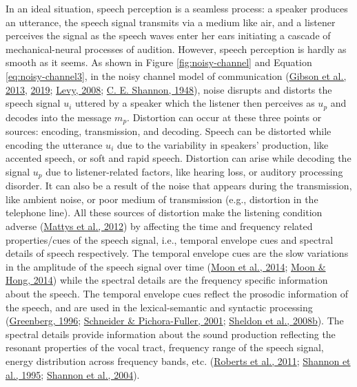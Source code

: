 \documentclass[a4paper, nobind]{templates/ociamthesis}
\begin{document}
In an ideal situation, speech perception is a seamless process: a speaker produces an utterance, the speech signal transmits via a medium like air, and a listener perceives the signal as the speech waves enter her ears initiating a cascade of mechanical-neural processes of audition.
However, speech perception is hardly as smooth as it seems.
As shown in Figure \ref{fig:noisy-channel} and Equation \eqref{eq:noisy-channel3}, in the noisy channel model of communication (\protect\hyperlink{ref-Gibson2013}{Gibson et al., 2013}, \protect\hyperlink{ref-Gibson2019}{2019}; \protect\hyperlink{ref-Levy2008}{Levy, 2008}; \protect\hyperlink{ref-Shannon1948}{C. E. Shannon, 1948}),
noise disrupts and distorts the speech signal \(u_i\) uttered by a speaker
which the listener then perceives as \(u_p\) and decodes into the message \(m_p\).
Distortion can occur at these three points or sources: encoding, transmission, and decoding.
Speech can be distorted while encoding the utterance \(u_i\) due to the variability in speakers' production, like accented speech, or soft and rapid speech.
Distortion can arise while decoding the signal \(u_p\) due to listener-related factors, like hearing loss, or auditory processing disorder.
It can also be a result of the noise that appears during the transmission, like ambient noise, or poor medium of transmission (e.g., distortion in the telephone line).
All these sources of distortion make the listening condition adverse (\protect\hyperlink{ref-Mattys2012}{Mattys et al., 2012}) by affecting the time and frequency related properties/cues of the speech signal, i.e., temporal envelope cues and spectral details of speech respectively.
The temporal envelope cues are the slow variations in the amplitude of the speech signal over time (\protect\hyperlink{ref-Moon2014}{Moon et al., 2014}; \protect\hyperlink{ref-Moon2014a}{Moon \& Hong, 2014}) while the spectral details are the frequency specific information about the speech.
The temporal envelope cues reflect the prosodic information of the speech, and are used in the lexical-semantic and syntactic processing (\protect\hyperlink{ref-Greenberg1996}{Greenberg, 1996}; \protect\hyperlink{ref-Schneider2001}{Schneider \& Pichora-Fuller, 2001}; \protect\hyperlink{ref-Sheldon2008b}{Sheldon et al., 2008b}).
The spectral details provide information about the sound production reflecting the resonant properties of the vocal tract, frequency range of the speech signal, energy distribution across frequency bands, etc. (\protect\hyperlink{ref-Roberts2011}{Roberts et al., 2011}; \protect\hyperlink{ref-Shannon1995}{Shannon et al., 1995}; \protect\hyperlink{ref-Shannon2004}{Shannon et al., 2004}).
\end{document}
